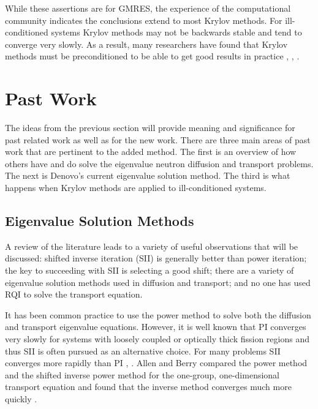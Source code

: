 While these assertions are for GMRES, the experience of the computational community indicates the conclusions extend to most Krylov methods. For ill-conditioned systems Krylov methods may not be backwards stable and tend to converge very slowly. As a result, many researchers have found that Krylov methods must be preconditioned to be able to get good results in practice \cite{Benzi2002}, \cite{Trefethen1997} , \cite{Paige2006}. 

\section{Past Work}
The ideas from the previous section will provide meaning and significance for past related work as well as for the new work. %
There are three main areas of past work that are pertinent to the added method. The first is an overview of how others have and do solve the eigenvalue neutron diffusion and transport problems. The next is Denovo's current eigenvalue solution method. The third is what happens when Krylov methods are applied to ill-conditioned systems.

\subsection{Eigenvalue Solution Methods}
A review of the literature leads to a variety of useful observations that will be discussed: shifted inverse iteration (SII) is generally better than power iteration; the key to succeeding with SII is selecting a good shift; there are a variety of eigenvalue solution methods used in diffusion and transport; and no one has used RQI to solve the transport equation.

It has been common practice to use the power method to solve both the diffusion and transport eigenvalue equations. However, it is well known that PI converges very slowly for systems with loosely coupled or optically thick fission regions and thus SII is often pursued as an alternative choice. For many problems SII converges more rapidly than PI \cite{Adams2002}, \cite{Evans2011}. Allen and Berry compared the power method and the shifted inverse power method for the one-group, one-dimensional transport equation and found that the inverse method converges much more quickly \cite{Allen2002}. 

